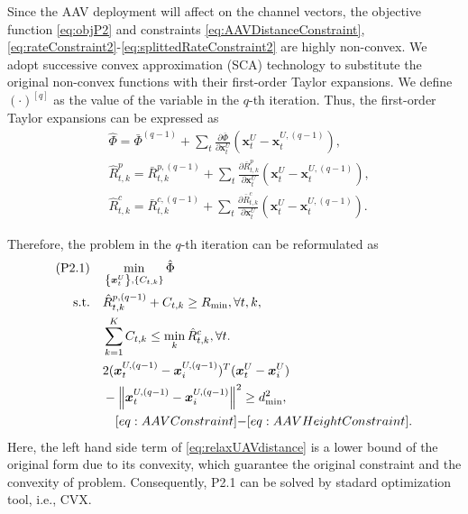 \documentclass[twocolumn,journal]{IEEEtran}
\begin{document}
Since the AAV deployment will affect on the channel vectors, the objective function \eqref{eq:objP2} and constraints \eqref{eq:AAVDistanceConstraint}, \eqref{eq:rateConstraint2}-\eqref{eq:splittedRateConstraint2} are highly non-convex. We adopt successive convex approximation (SCA) technology to substitute the original non-convex functions with their first-order Taylor expansions. 
We define \((\cdot)^{[q]}\) as the value of the variable in the \(q\)-th iteration. Thus, the first-order Taylor expansions can be expressed as
\begin{subequations}
\begin{align}
    &\hat{\Phi} = \bar{{\Phi}}^{(q-1)} + \sum_{t}\frac{\partial \bar{{\Phi}}}{\partial \boldsymbol{x}^{U}_{t}}\left(\boldsymbol{x}^{U}_{t}-\boldsymbol{x}^{U,(q-1)}_{t}\right),\\
    &\hat{R}^{p}_{t,k} = \bar{R}^{p,(q-1)}_{t,k}+\sum_t \frac{\partial \bar{R}^{p}_{t,k}}{\partial \boldsymbol{x}^{U}_{t}}\left(\boldsymbol{x}^{U}_{t}-\boldsymbol{x}^{U,(q-1)}_{t}\right),\\
    &\hat{R}^{c}_{t,k} =\bar{R}^{c,(q-1)}_{t,k}+\sum_t \frac{\partial \bar{R}^{c}_{t,k}}{\partial \boldsymbol{x}^{U}_{t}}\left(\boldsymbol{x}^{U}_{t}-\boldsymbol{x}^{U,(q-1)}_{t}\right).
\end{align}
\end{subequations}

Therefore, the problem in the \(q\)-th iteration can be reformulated as
\begin{subequations}
\begin{align}
    (\text{P2.1})\quad&\min_{\left\{\boldsymbol{x}^{U}_{t}\right\},\left\{C_{t,k}\right\}} \hat{\Phi}\label{eq:objP2}\\
    \text{s.t.}\quad& \hat{R}^{p,(q-1)}_{t,k} + C_{t,k} \geq R_{\min}, \forall t,k, \label{eq:rateConstraint2.1}
    \\
    & \sum_{k=1}^{K} C_{t,k} \leq \min_{k}\hat{R}^{c}_{t,k}, \forall t. \label{eq:splittedRateConstraint2.1}\\
    & 2(\boldsymbol{x}^{U,(q-1)}_{t} - \boldsymbol{x}^{U,(q-1)}_{i})^T(\boldsymbol{x}^{U}_{t} - \boldsymbol{x}^{U}_{i})\notag\\
    & - \left\Vert \boldsymbol{x}^{U,(q-1)}_{t} - \boldsymbol{x}^{U,(q-1)}_{i}\right\Vert^2 \geq d_{\min}^2,\label{eq:relaxUAVdistance}
    \\
    &\quad\eqref{eq:AAVConstraint}\mbox{-}\eqref{eq:AAVHeightConstraint}.\notag
\end{align}
\end{subequations}
Here, the left hand side term of \eqref{eq:relaxUAVdistance} is a lower bound of the original form due to its convexity, which guarantee the original constraint and the convexity of problem. Consequently, P2.1 can be solved by stadard optimization tool, i.e., CVX.
\end{document}
